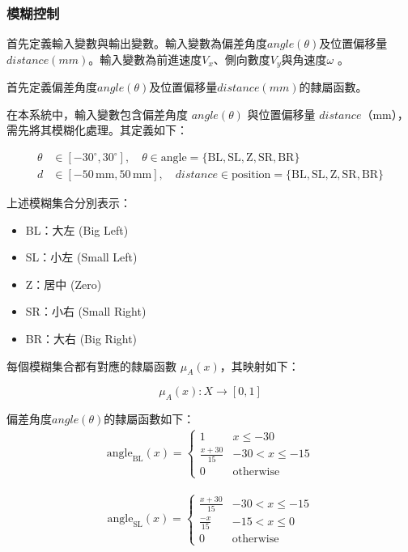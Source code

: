 \documentclass[12pt]{article}       %
\begin{document}
\subsubsection{模糊控制}
首先定義輸入變數與輸出變數。輸入變數為偏差角度$angle(\theta)$及位置偏移量$distance(mm)$。輸入變數為前進速度$V_{x}$、側向數度$V_{y}$與角速度$\omega$ 。

首先定義偏差角度$angle(\theta)$及位置偏移量$distance(mm)$的隸屬函數。

在本系統中，輸入變數包含偏差角度 $angle(\theta)$ 與位置偏移量 $distance$（mm），需先將其模糊化處理。其定義如下：

\begin{align}
    \theta &\in [-30^\circ, 30^\circ], \quad \theta \in \text{angle} = \{ \text{BL}, \text{SL}, \text{Z}, \text{SR}, \text{BR} \} \\
    d &\in [-50\,\text{mm}, 50\,\text{mm}], \quad distance \in \text{position} = \{ \text{BL}, \text{SL}, \text{Z}, \text{SR}, \text{BR} \}
\end{align}

上述模糊集合分別表示：
\begin{itemize}
    \item BL：大左 (Big Left)
    \item SL：小左 (Small Left)
    \item Z：居中 (Zero)
    \item SR：小右 (Small Right)
    \item BR：大右 (Big Right)
\end{itemize}

每個模糊集合都有對應的隸屬函數 $\mu_A(x)$，其映射如下：

\begin{equation}
    \mu_A(x) : X \rightarrow [0, 1]
\end{equation}


偏差角度$angle(\theta)$的隸屬函數如下：
\begin{align}
    \text{angle}_{\text{BL}}(x) = 
    \begin{cases}
    1 & x \le -30 \\
    \frac{x + 30}{15} & -30 < x \le -15 \\
    0 & \text{otherwise}
    \end{cases}    
\end{align}

\begin{align}
    \text{angle}_{\text{SL}}(x) = 
    \begin{cases}
    \frac{x + 30}{15} & -30 < x \le -15 \\
    \frac{-x}{15} & -15 < x \le 0 \\
    0 & \text{otherwise}
    \end{cases}    
\end{align}
\end{document}
